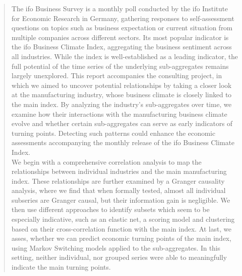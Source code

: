 \documentclass[12pt]{article}
\theoremstyle{plain}
\theoremstyle{definition}
\begin{document}
\begin{abstract}
The ifo Business Survey is a monthly poll conducted by the ifo Institute
for Economic Research in Germany, gathering responses to self-assessment questions on topics such as business
expectation or current situation from multiple companies 
across different sectors. Its most popular indicator is the ifo Business Climate Index, aggregating the business sentiment across all industries.
While the index is well-established as a leading indicator, the full potential of
the time series of the underlying sub-aggregates remains largely unexplored.
This report accompanies the consulting project, in which we aimed to uncover potential relationships by taking a closer look
at the manufacturing industry, whose business climate is closely linked to the
main index. By analyzing the industry’s sub-aggregates over time, we examine how their interactions with the manufacturing business climate evolve
and whether certain sub-aggregates can serve as early indicators of turning
points. Detecting such patterns could enhance the economic assessments accompanying the monthly release of the ifo Business Climate Index. \\
We begin with a comprehensive correlation analysis to map the relationships between individual industries and the main manufacturing index. These relationships are further examined by a Granger causality analysis, where we find that when formally tested, almost all individual subseries are Granger causal, but their information gain is negligible. We then use different approaches to identify subsets which seem to be especially indicative, such as an elastic net, a scoring model and clustering based on their cross-correlation function with the main index. At last, we asses, whether we can predict economic turning points of the main index, using Markov Switching models applied to the sub-aggregates. In this setting, neither individual, nor grouped series were able to meaningfully indicate the main turning points.  
\end{abstract}


\newpage
\tableofcontents

\newpage
\listoffigures
\newpage
\listoftables
\newpage


    


\end{document}
